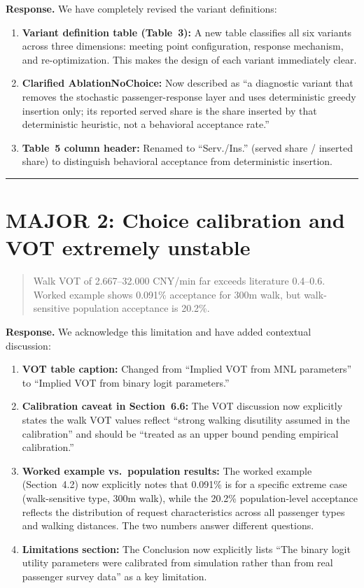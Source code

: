\documentclass[12pt]{article}
\newenvironment{revcomment}{%
  \begin{quote}\itshape
}{%
  \end{quote}
}
\begin{document}
\textbf{Response.} We have completely revised the variant definitions:

\begin{enumerate}
  \item \textbf{Variant definition table (Table~3):} A new table classifies all six variants across three dimensions: meeting point configuration, response mechanism, and re-optimization. This makes the design of each variant immediately clear.

  \item \textbf{Clarified AblationNoChoice:} Now described as ``a diagnostic variant that removes the stochastic passenger-response layer and uses deterministic greedy insertion only; its reported served share is the share inserted by that deterministic heuristic, not a behavioral acceptance rate.''

  \item \textbf{Table~5 column header:} Renamed to ``Serv./Ins.'' (served share / inserted share) to distinguish behavioral acceptance from deterministic insertion.
\end{enumerate}

\bigskip\hrule\bigskip

\section*{MAJOR 2: Choice calibration and VOT extremely unstable}

\begin{revcomment}
Walk VOT of 2.667--32.000 CNY/min far exceeds literature 0.4--0.6. Worked example shows 0.091\% acceptance for 300m walk, but walk-sensitive population acceptance is 20.2\%.
\end{revcomment}

\textbf{Response.} We acknowledge this limitation and have added contextual discussion:

\begin{enumerate}
  \item \textbf{VOT table caption:} Changed from ``Implied VOT from MNL parameters'' to ``Implied VOT from binary logit parameters.''

  \item \textbf{Calibration caveat in Section~6.6:} The VOT discussion now explicitly states the walk VOT values reflect ``strong walking disutility assumed in the calibration'' and should be ``treated as an upper bound pending empirical calibration.''

  \item \textbf{Worked example vs.\ population results:} The worked example (Section~4.2) now explicitly notes that 0.091\% is for a specific extreme case (walk-sensitive type, 300m walk), while the 20.2\% population-level acceptance reflects the distribution of request characteristics across all passenger types and walking distances. The two numbers answer different questions.

  \item \textbf{Limitations section:} The Conclusion now explicitly lists ``The binary logit utility parameters were calibrated from simulation rather than from real passenger survey data'' as a key limitation.
\end{enumerate}
\end{document}
